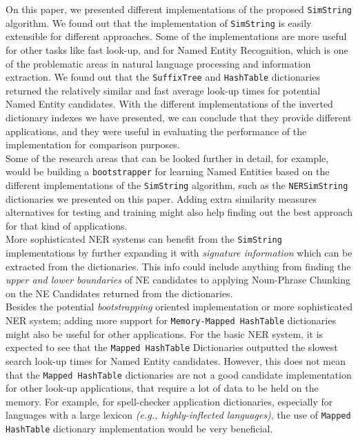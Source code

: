 On this paper, we presented different implementations of the proposed \texttt{SimString} algorithm. We found out that the implementation of \texttt{SimString} is easily extensible for different approaches. Some of the implementations are more useful for other tasks like fast look-up, and for Named Entity Recognition, which is one of the problematic areas in natural language processing and information extraction. We found out that the \texttt{SuffixTree} and \texttt{HashTable} dictionaries returned the relatively similar and fast average look-up times for potential Named Entity candidates. With the different implementations of the inverted dictionary indexes we have presented, we can conclude that they provide different applications, and they were useful in evaluating the performance of the implementation for comparison purposes.\\

Some of the research areas that can be looked further in detail, for example, would be building a \texttt{bootstrapper} for learning Named Entities based on the different implementations of the \texttt{SimString} algorithm, such as the \texttt{NERSimString} dictionaries we presented on this paper. Adding extra similarity measures alternatives for testing and training might also help finding out the best approach for that kind of applications.\\

More sophisticated NER systems can benefit from the \texttt{SimString} implementations by further expanding it with \textit{signature information} which can be extracted from the dictionaries. This info could include anything from finding the \textit{upper and lower boundaries} of NE candidates to applying Noun-Phrase Chunking on the NE Candidates returned from the dictionaries.\\

Besides the potential \textit{bootstrapping} oriented implementation or more sophisticated NER system; adding more support for \texttt{Memory-Mapped HashTable} dictionaries might also be useful for other applications. For the basic NER system, it is expected to see that the \texttt{Mapped HashTable} Dictionaries outputted the slowest search look-up times for Named Entity candidates. However, this does not mean that the \texttt{Mapped HashTable} dictionaries are not a good candidate implementation for other look-up applications, that require a lot of data to be held on the memory. For example, for spell-checker application dictionaries, especially for languages with a large lexicon \textit{(e.g., highly-inflected languages)}, the use of \texttt{Mapped HashTable} dictionary implementation would be very beneficial.\\

